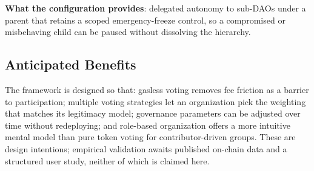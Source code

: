 \textbf{What the configuration provides}: delegated autonomy to sub-DAOs
under a parent that retains a scoped emergency-freeze control, so a
compromised or misbehaving child can be paused without dissolving the
hierarchy.

\subsection{Anticipated Benefits}

The framework is designed so that: gasless voting removes fee friction
as a barrier to participation; multiple voting strategies let an
organization pick the weighting that matches its legitimacy model;
governance parameters can be adjusted over time without redeploying;
and role-based organization offers a more intuitive mental model than
pure token voting for contributor-driven groups. These are design
intentions; empirical validation awaits published on-chain data and a
structured user study, neither of which is claimed here.
